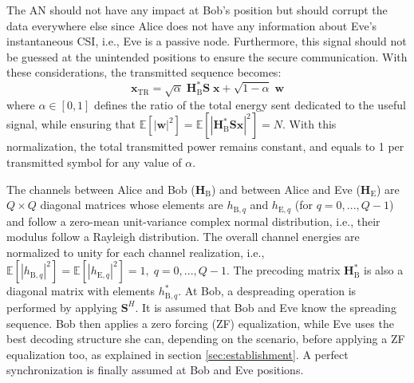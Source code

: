 \documentclass[journal,comsoc]{IEEEtran}
\newcommand{\module}[1]{\left|#1\right|}
\newcommand{\EX}[1]{\mathbb{E} \left[#1\right]}%
\newcommand{\HE}{\textbf{H}_{\text{E}}}
\newcommand{\HB}{\textbf{H}_{\text{B}}}
\newcommand{\spread}{\textbf{S}}
\newcommand{\w}{\textbf{w}}
\newcommand{\mat}[1]{\boldsymbol{\mathrm{#1}}}
\begin{document}
The AN should not have any impact at Bob's position but should corrupt the data everywhere else since Alice does not have any information about Eve's instantaneous CSI, i.e., Eve is a passive node. Furthermore, this signal should not be guessed at the unintended positions to ensure the secure communication. With these considerations, the transmitted sequence becomes:
\begin{equation}
	\textbf{x}_{\text{TR}} = \sqrt{\alpha} \;\HB^*  \spread\; \textbf{x} +  \sqrt{1-\alpha} \; \w
	\label{eq:sym_rad_AN}
\end{equation} 
where $\alpha \in [0,1]$ defines the ratio of the total energy sent dedicated to the useful signal, while ensuring that $\EX{\module{\w}^2} = \EX{\module{\HB^*\spread\textbf{x}}^2} =  N$. With this normalization, the total transmitted power remains constant, and equals to 1 per transmitted symbol for any value of $\alpha$.

The channels between Alice and Bob ($\HB$) and between Alice and Eve ($\HE$) are $Q\times Q$ diagonal matrices whose elements are $h_{\text{B},q}$ and $h_{\text{E},q}$ (for $q = 0,...,Q-1$) and follow a zero-mean unit-variance complex normal distribution, i.e., their modulus follow a Rayleigh distribution. The overall channel energies are normalized to unity for each channel realization, i.e., $\mathbb{E}\left[\left|h_{\text{B},q}\right|^2\right]  = \mathbb{E}\left[\left|h_{\text{E},q}\right|^2\right] = 1, \; q = 0,...,Q-1$. The precoding matrix $\HB^*$ is also a diagonal matrix with elements $h_{\text{B},q}^*$. At Bob, a despreading operation is performed by applying $\spread^H$. It is assumed that Bob and Eve know the spreading sequence. Bob then applies a zero forcing (ZF) equalization, while Eve uses the best decoding structure \mat{G} she can, depending on the scenario, before applying a ZF equalization too, as explained in section \ref{sec:establishment}. A perfect synchronization is finally assumed at Bob and Eve positions.\\







%
\end{document}
